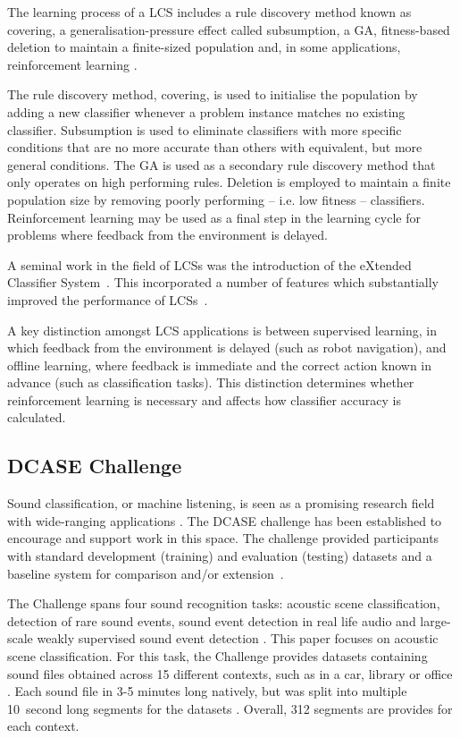 \documentclass[11pt]{article}
\begin{document}
The learning process of a LCS includes a rule discovery method known as covering, a generalisation-pressure effect called subsumption, a GA, fitness-based deletion to maintain a finite-sized population and, in some applications, reinforcement learning \cite{Butz2000}.

The rule discovery method, covering, is used to initialise the population by adding a new classifier whenever a problem instance matches no existing classifier. Subsumption is used to eliminate classifiers with more specific conditions that are no more accurate than others with equivalent, but more general conditions. The GA is used as a secondary rule discovery method that only operates on high performing rules. Deletion is employed to maintain a finite population size by removing poorly performing -- i.e. low fitness -- classifiers. Reinforcement learning may be used as a final step in the learning cycle for problems where feedback from the environment is delayed.

A seminal work in the field of LCSs was the introduction of the eXtended Classifier System~\cite{Lanzi2008,Sigaud2007}. This incorporated a number of features which substantially improved the performance of LCSs~\cite{Lanzi2008}.

A key distinction amongst LCS applications is between supervised learning, in which feedback from the environment is delayed (such as robot navigation), and offline learning, where feedback is immediate and the correct action known in advance (such as classification tasks). This distinction determines whether reinforcement learning is necessary and affects how classifier accuracy is calculated.



\subsection{DCASE Challenge}
\label{sec:DCASE}

Sound classification, or machine listening, is seen as a promising research field with wide-ranging applications \cite{Mesaros2017}. The DCASE challenge has been established to encourage and support work in this space. The challenge provided participants with standard development (training) and evaluation (testing) datasets \cite{Mesaros2016} and a baseline system for comparison and/or extension~\cite{Mesaros2017,DCASE2017asc}.

The Challenge spans four sound recognition tasks: acoustic scene classification, detection of rare sound events, sound event detection in real life audio and large-scale weakly supervised sound event detection \cite{Mesaros2017}. This paper focuses on acoustic scene classification. For this task, the Challenge provides datasets containing sound files obtained across 15 different contexts, such as in a car, library or office \cite{DCASE2017asc}. Each sound file in 3-5 minutes long natively, but was split into multiple 10~second long segments for the datasets \cite{DCASE2017asc}. Overall, 312 segments are provides for each context.
\end{document}
